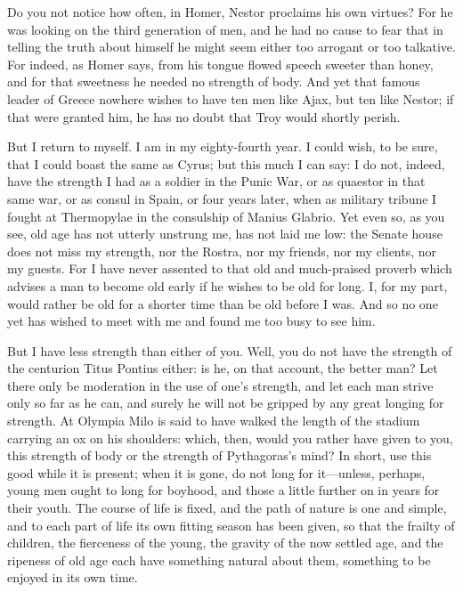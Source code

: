  Do you not notice how often, in Homer, Nestor proclaims his own virtues? For he was looking on the third generation of men, and he had no cause to fear that in telling the truth about himself he might seem either too arrogant or too talkative. For indeed, as Homer says, from his tongue flowed speech sweeter than honey, and for that sweetness he needed no strength of body. And yet that famous leader of Greece nowhere wishes to have ten men like Ajax, but ten like Nestor; if that were granted him, he has no doubt that Troy would shortly perish.

 But I return to myself. I am in my eighty-fourth year. I could wish, to be sure, that I could boast the same as Cyrus; but this much I can say: I do not, indeed, have the strength I had as a soldier in the Punic War, or as quaestor in that same war, or as consul in Spain, or four years later, when as military tribune I fought at Thermopylae in the consulship of Manius Glabrio. Yet even so, as you see, old age has not utterly unstrung me, has not laid me low: the Senate house does not miss my strength, nor the Rostra, nor my friends, nor my clients, nor my guests. For I have never assented to that old and much-praised proverb which advises a man to become old early if he wishes to be old for long. I, for my part, would rather be old for a shorter time than be old before I was. And so no one yet has wished to meet with me and found me too busy to see him.

 But I have less strength than either of you. Well, you do not have the strength of the centurion Titus Pontius either: is he, on that account, the better man? Let there only be moderation in the use of one's strength, and let each man strive only so far as he can, and surely he will not be gripped by any great longing for strength. At Olympia Milo is said to have walked the length of the stadium carrying an ox on his shoulders: which, then, would you rather have given to you, this strength of body or the strength of Pythagoras's mind? In short, use this good while it is present; when it is gone, do not long for it—unless, perhaps, young men ought to long for boyhood, and those a little further on in years for their youth. The course of life is fixed, and the path of nature is one and simple, and to each part of life its own fitting season has been given, so that the frailty of children, the fierceness of the young, the gravity of the now settled age, and the ripeness of old age each have something natural about them, something to be enjoyed in its own time.

